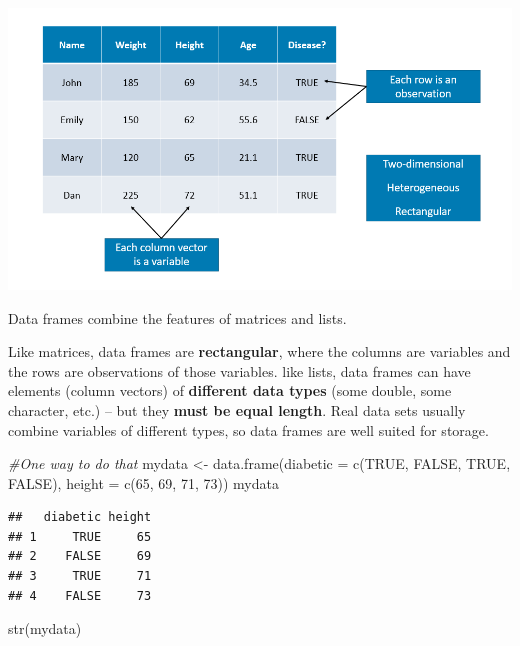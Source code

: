 \documentclass[
]{book}
\newenvironment{Shaded}{\begin{snugshade}}{\end{snugshade}}
\newcommand{\AttributeTok}[1]{\textcolor[rgb]{0.77,0.63,0.00}{#1}}
\newcommand{\CommentTok}[1]{\textcolor[rgb]{0.56,0.35,0.01}{\textit{#1}}}
\newcommand{\ConstantTok}[1]{\textcolor[rgb]{0.00,0.00,0.00}{#1}}
\newcommand{\DecValTok}[1]{\textcolor[rgb]{0.00,0.00,0.81}{#1}}
\newcommand{\FunctionTok}[1]{\textcolor[rgb]{0.00,0.00,0.00}{#1}}
\newcommand{\NormalTok}[1]{#1}
\newcommand{\OtherTok}[1]{\textcolor[rgb]{0.56,0.35,0.01}{#1}}
\begin{document}
\includegraphics[width=13.56in]{png/dataframe}

Data frames combine the features of matrices and lists.

Like matrices, data frames are \textbf{rectangular}, where the columns are variables and the rows are observations of those variables. like lists, data frames can have elements (column vectors) of \textbf{different data types} (some double, some character, etc.) -- but they \textbf{must be equal length}. Real data sets usually combine variables of different types, so data frames are well suited for storage.

\begin{Shaded}
\begin{Highlighting}[]
\CommentTok{\#One way to do that}
\NormalTok{mydata }\OtherTok{\textless{}{-}} \FunctionTok{data.frame}\NormalTok{(}\AttributeTok{diabetic =} \FunctionTok{c}\NormalTok{(}\ConstantTok{TRUE}\NormalTok{, }\ConstantTok{FALSE}\NormalTok{, }\ConstantTok{TRUE}\NormalTok{, }\ConstantTok{FALSE}\NormalTok{), }
                     \AttributeTok{height =} \FunctionTok{c}\NormalTok{(}\DecValTok{65}\NormalTok{, }\DecValTok{69}\NormalTok{, }\DecValTok{71}\NormalTok{, }\DecValTok{73}\NormalTok{))}
\NormalTok{mydata}
\end{Highlighting}
\end{Shaded}

\begin{verbatim}
##   diabetic height
## 1     TRUE     65
## 2    FALSE     69
## 3     TRUE     71
## 4    FALSE     73
\end{verbatim}

\begin{Shaded}
\begin{Highlighting}[]
\FunctionTok{str}\NormalTok{(mydata)}
\end{Highlighting}
\end{Shaded}
\end{document}
